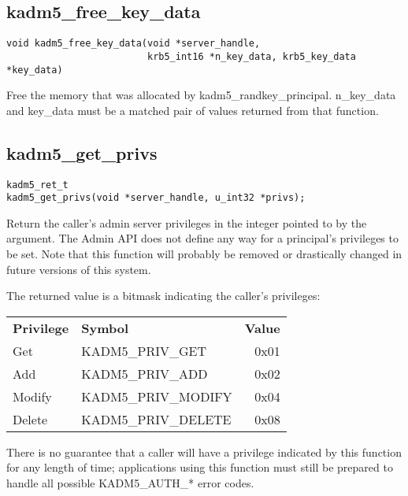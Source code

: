 \subsection{kadm5_free_key_data}

\begin{verbatim}
void kadm5_free_key_data(void *server_handle,
                         krb5_int16 *n_key_data, krb5_key_data *key_data)
\end{verbatim}

Free the memory that was allocated by kadm5_randkey_principal.
n_key_data and key_data must be a matched pair of values returned from
that function.

\subsection{kadm5_get_privs}

\begin{verbatim}
kadm5_ret_t
kadm5_get_privs(void *server_handle, u_int32 *privs);
\end{verbatim}

Return the caller's admin server privileges in the integer pointed to
by the argument.  The Admin API does not define any way for a
principal's privileges to be set.  Note that this function will
probably be removed or drastically changed in future versions of this
system.

The returned value is a bitmask indicating the caller's privileges:

\begin{tabular}{llr}
{\bf Privilege} & {\bf Symbol} & {\bf Value} \\
Get & KADM5_PRIV_GET & 0x01 \\
Add & KADM5_PRIV_ADD & 0x02 \\
Modify & KADM5_PRIV_MODIFY & 0x04 \\
Delete & KADM5_PRIV_DELETE & 0x08
\end{tabular}

There is no guarantee that a caller will have a privilege indicated by
this function for any length of time; applications using this function
must still be prepared to handle all possible KADM5_AUTH_* error
codes.


